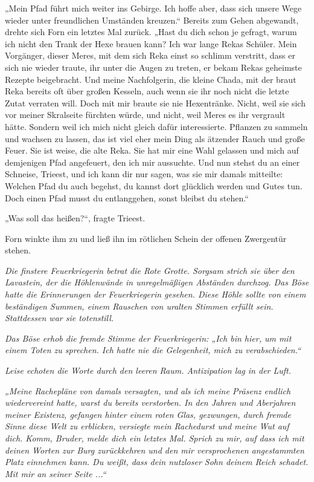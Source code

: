 „Mein Pfad führt mich weiter ins Gebirge. Ich hoffe aber, dass sich unsere Wege wieder unter freundlichen Umständen kreuzen.“ Bereits zum Gehen abgewandt, drehte sich Forn ein letztes Mal zurück. „Hast du dich schon je gefragt, warum ich nicht den Trank der Hexe brauen kann? Ich war lange Rekas Schüler. Mein Vorgänger, dieser Meres, mit dem sich Reka einst so schlimm verstritt, dass er sich nie wieder traute, ihr unter die Augen zu treten, er bekam Rekas geheimste Rezepte beigebracht. Und meine Nachfolgerin, die kleine Chada, mit der braut Reka bereits oft über großen Kesseln, auch wenn sie ihr noch nicht die letzte Zutat verraten will. Doch mit mir braute sie nie Hexentränke. Nicht, weil sie sich vor meiner Skralseite fürchten würde, und nicht, weil Meres es ihr vergrault hätte. Sondern weil ich mich nicht gleich dafür interessierte. Pflanzen zu sammeln und wachsen zu lassen, das ist viel eher mein Ding als ätzender Rauch und große Feuer. Sie ist weise, die alte Reka. Sie hat mir eine Wahl gelassen und mich auf demjenigen Pfad angefeuert, den ich mir aussuchte. Und nun stehst du an einer Schneise, Trieest, und ich kann dir nur sagen, was sie mir damals mitteilte: Welchen Pfad du auch begehst, du kannst dort glücklich werden und Gutes tun. Doch einen Pfad musst du entlanggehen, sonst bleibst du stehen.“

„Was soll das heißen?“, fragte Trieest.

Forn winkte ihm zu und ließ ihn im rötlichen Schein der offenen Zwergentür stehen.



\trennzeichen



\textit{Die finstere Feuerkriegerin betrat die Rote Grotte. Sorgsam strich sie über den Lavastein, der die Höhlenwände in unregelmäßigen Abständen durchzog. Das Böse hatte die Erinnerungen der Feuerkriegerin gesehen. Diese Höhle sollte von einem beständigen Summen, einem Rauschen von uralten Stimmen erfüllt sein. Stattdessen war sie totenstill.}

\textit{Das Böse erhob die fremde Stimme der Feuerkriegerin: „Ich bin hier, um mit einem Toten zu sprechen. Ich hatte nie die Gelegenheit, mich zu verabschieden.“}

\textit{Leise echoten die Worte durch den leeren Raum. Antizipation lag in der Luft.}

\textit{„Meine Rachepläne von damals versagten, und als ich meine Präsenz endlich wiedervereint hatte, warst du bereits verstorben. In den Jahren und Aberjahren meiner Existenz, gefangen hinter einem roten Glas, gezwungen, durch fremde Sinne diese Welt zu erblicken, versiegte mein Rachedurst und meine Wut auf dich. Komm, Bruder, melde dich ein letztes Mal. Sprich zu mir, auf dass ich mit deinen Worten zur Burg zurückkehren und den mir versprochenen angestammten Platz einnehmen kann. Du weißt, dass dein nutzloser Sohn deinem Reich schadet. Mit mir an seiner Seite ...“}

